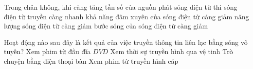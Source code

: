 \begin{ex} %
Trong chân không, khi càng tăng tần số của nguồn phát sóng điện từ thì
\choice
{sóng điện từ truyền càng nhanh}
{khả năng đâm xuyên của sóng điện từ càng giảm}
{năng lượng sóng điện từ càng giảm}
{\True bước sóng của sóng điện từ càng giảm}
\end{ex} 
\begin{ex} %
Hoạt động nào sau đây là kết quả của việc truyền thông tin liên lạc bằng sóng vô tuyến?
\choice
{Xem phim từ đầu đĩa $DVD$}
{\True Xem thời sự truyền hình qua vệ tinh}
{Trò chuyện bằng điện thoại bàn}
{Xem phim từ truyền hình cáp}
\end{ex} 

























